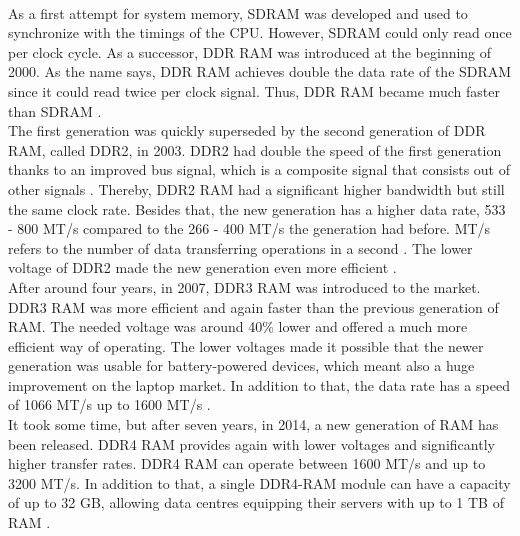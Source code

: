 \\
As a first attempt for system memory, \gls{SDRAM} was developed and used to synchronize with the timings of the CPU. However, SDRAM could only read once per clock cycle. As a successor, DDR RAM was introduced at the beginning of 2000. As the name says, DDR RAM achieves double the data rate of the SDRAM since it could read twice per clock signal. Thus, DDR RAM became much faster than SDRAM \parencite{RAM_generations}.
\\
The first generation was quickly superseded by the second generation of DDR RAM, called DDR2, in 2003. DDR2 had double the speed of the first generation thanks to an improved bus signal, which is a composite signal that consists out of other signals \parencite{DDR2_bus}. Thereby, DDR2 RAM had a significant higher bandwidth but still the same clock rate. Besides that, the new generation has a higher data rate, 533 - 800 MT/s compared to the 266 - 400 MT/s the generation had before. \gls{MT/s} refers to the number of data transferring operations in a second \parencite{RAM_Speed}. The lower voltage of DDR2 made the new generation even more efficient \parencite{RAM_generations}. 
\\
After around four years, in 2007, DDR3 RAM was introduced to the market. DDR3 RAM was more efficient and again faster than the previous generation of RAM. The needed voltage was around 40\% lower and offered a much more efficient way of operating. The lower voltages made it possible that the newer generation was usable for battery-powered devices, which meant also a huge improvement on the laptop market. In addition to that, the data rate has a speed of 1066 MT/s up to 1600 MT/s \parencite{DDR2_vs_DDR3}. 
\\
It took some time, but after seven years, in 2014, a new generation of RAM has been released. DDR4 RAM provides again with lower voltages and significantly higher transfer rates. DDR4 RAM can operate between 1600 MT/s and up to 3200 MT/s. In addition to that, a single DDR4-RAM module can have a capacity of up to 32 GB, allowing data centres equipping their servers with up to 1 TB of RAM \parencite{RAM_generations, RAM_generations_2}.
\\
\\
